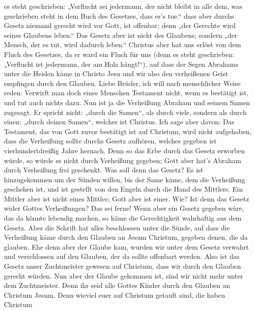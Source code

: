 es steht geschrieben: „Verflucht sei jedermann, der nicht bleibt in alle
dem, was geschrieben steht in dem Buch des Gesetzes, dass er's tue.``
 dass aber durchs Gesetz niemand gerecht wird vor Gott, ist
offenbar; denn „der Gerechte wird seines Glaubens leben.`` 
Das Gesetz aber ist nicht des Glaubens; sondern „der Mensch, der es tut,
wird dadurch leben.``  Christus aber hat uns erlöst von dem
Fluch des Gesetzes, da er ward ein Fluch für uns (denn es steht
geschrieben: „Verflucht ist jedermann, der am Holz hängt!{}``),
 auf dass der Segen Abrahams unter die Heiden käme in
Christo Jesu und wir also den verheißenen Geist empfingen durch den
Glauben.  Liebe Brüder, ich will nach menschlicher Weise
reden: Verwirft man doch eines Menschen Testament nicht, wenn es
bestätigt ist, und tut auch nichts dazu.  Nun ist ja die
Verheißung Abraham und seinem Samen zugesagt. Er spricht nicht: „durch
die Samen``, als durch viele, sondern als durch einen: „durch deinen
Samen``, welcher ist Christus.  Ich sage aber davon: Das
Testament, das von Gott zuvor bestätigt ist auf Christum, wird nicht
aufgehoben, dass die Verheißung sollte durchs Gesetz aufhören, welches
gegeben ist vierhundertdreißig Jahre hernach.  Denn so das
Erbe durch das Gesetz erworben würde, so würde es nicht durch Verheißung
gegeben; Gott aber hat's Abraham durch Verheißung frei geschenkt.
 Was soll denn das Gesetz? Es ist hinzugekommen um der
Sünden willen, bis der Same käme, dem die Verheißung geschehen ist, und
ist gestellt von den Engeln durch die Hand des Mittlers. 
Ein Mittler aber ist nicht eines Mittler; Gott aber ist einer.
 Wie? Ist denn das Gesetz wider Gottes Verheißungen? Das
sei ferne! Wenn aber ein Gesetz gegeben wäre, das da könnte lebendig
machen, so käme die Gerechtigkeit wahrhaftig aus dem Gesetz.
 Aber die Schrift hat alles beschlossen unter die Sünde,
auf dass die Verheißung käme durch den Glauben an Jesum Christum,
gegeben denen, die da glauben.  Ehe denn aber der Glaube
kam, wurden wir unter dem Gesetz verwahrt und verschlossen auf den
Glauben, der da sollte offenbart werden.  Also ist das
Gesetz unser Zuchtmeister gewesen auf Christum, dass wir durch den
Glauben gerecht würden.  Nun aber der Glaube gekommen ist,
sind wir nicht mehr unter dem Zuchtmeister.  Denn ihr seid
alle Gottes Kinder durch den Glauben an Christum Jesum. 
Denn wieviel euer auf Christum getauft sind, die haben Christum
